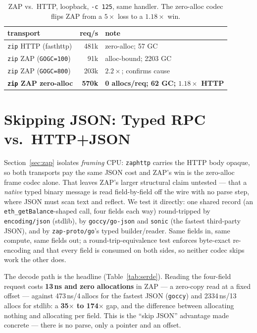 \documentclass[11pt,twocolumn]{article}
\begin{document}
\begin{table}[t]
\centering
\caption{ZAP vs.\ HTTP, loopback, \texttt{-c 125}, same handler. The zero-alloc
codec flips ZAP from a $5\times$ loss to a $1.18\times$ win.}
\label{tab:zap}
\begin{tabular}{lrl}
\toprule
transport & req/s & note \\
\midrule
\texttt{zip} HTTP (fasthttp)          & 481k & zero-alloc; 57 GC \\
\texttt{zip} ZAP (\texttt{GOGC=100})  & 91k  & alloc-bound; 2203 GC \\
\texttt{zip} ZAP (\texttt{GOGC=800})  & 203k & $2.2\times$; confirms cause \\
\textbf{\texttt{zip} ZAP zero-alloc}  & \textbf{570k} & \textbf{0 allocs/req; 62 GC; $1.18\times$ HTTP} \\
\bottomrule
\end{tabular}
\end{table}

\section{Skipping JSON: Typed RPC vs.\ HTTP+JSON}
\label{sec:json}
Section~\ref{sec:zap} isolates \emph{framing} CPU: \texttt{zaphttp} carries the
HTTP body opaque, so both transports pay the same JSON cost and ZAP's win is the
zero-alloc frame codec alone. That leaves ZAP's larger structural claim untested
--- that a \emph{native} typed binary message is read field-by-field off the wire
with no parse step, where JSON must scan text and reflect. We test it directly:
one shared record (an \texttt{eth\_getBalance}-shaped call, four fields each way)
round-tripped by \texttt{encoding/json} (stdlib), by \texttt{goccy/go-json} and
\texttt{sonic} (the fastest third-party JSON), and by \texttt{zap-proto/go}'s
typed builder/reader. Same fields in, same compute, same fields out; a
round-trip-equivalence test enforces byte-exact re-encoding and that every field
is consumed on both sides, so neither codec skips work the other does.

The decode path is the headline (Table~\ref{tab:serde}). Reading the four-field
request costs \textbf{13\,ns and zero allocations} in ZAP --- a zero-copy read at
a fixed offset --- against 473\,ns/4\,allocs for the fastest JSON
(\texttt{goccy}) and 2334\,ns/13\,allocs for stdlib: a \textbf{35$\times$ to
174$\times$} gap, and the difference between allocating nothing and allocating
per field. This is the ``skip JSON'' advantage made concrete --- there is no
parse, only a pointer and an offset.
\end{document}
